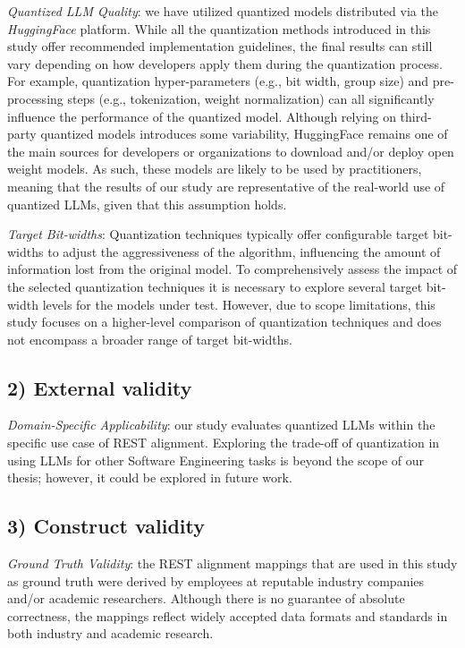 \documentclass[conference]{IEEEtran}
\begin{document}
\textit{Quantized LLM Quality}: we have utilized quantized models distributed via the \textit{HuggingFace} platform. While all the quantization methods introduced in this study offer recommended implementation guidelines, the final results can still vary depending on how developers apply them during the quantization process. For example, quantization hyper-parameters (e.g., bit width, group size) and pre-processing steps (e.g., tokenization, weight normalization) can all significantly influence the performance of the quantized model. Although relying on third-party quantized models introduces some variability, HuggingFace remains one of the main sources for developers or organizations to download and/or deploy open weight models. As such, these models are likely to be used by practitioners, meaning that the results of our study are representative of the real-world use of quantized LLMs, given that this assumption holds.

\textit{Target Bit-widths}: Quantization techniques typically offer configurable target bit-widths to adjust the aggressiveness of the algorithm, influencing the amount of information lost from the original model. To comprehensively assess the impact of the selected quantization techniques it is necessary to explore several target bit-width levels for the models under test. However, due to scope limitations, this study focuses on a higher-level comparison of quantization techniques and does not encompass a broader range of target bit-widths. 

\subsection*{\textbf{2) External validity}}
    
\textit{Domain-Specific Applicability}: our study evaluates quantized LLMs within the specific use case of REST alignment. Exploring the trade-off of quantization in using LLMs for other Software Engineering tasks is beyond the scope of our thesis; however, it could be explored in future work.

\subsection*{\textbf{3) Construct validity}}

\textit{Ground Truth Validity}: the REST alignment mappings that are used in this study as ground truth were derived by employees at reputable industry companies and/or academic researchers. Although there is no guarantee of absolute correctness, the mappings reflect widely accepted data formats and standards in both industry and academic research.
\end{document}
